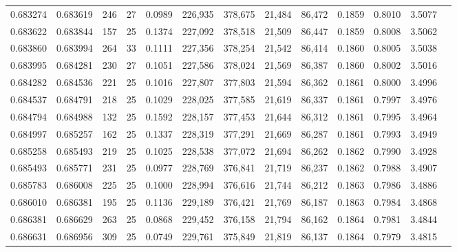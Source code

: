 \begin{tabular}{rrrrrrrrrrrrr}
0.683274 & 0.683619 &   246 &  27 &                                     0.0989 & 226,935 & 378,675 &  21,484 &  86,472 & 0.1859 & 0.8010 & 3.5077 \\
0.683622 & 0.683844 &   157 &  25 &                                     0.1374 & 227,092 & 378,518 &  21,509 &  86,447 & 0.1859 & 0.8008 & 3.5062 \\
0.683860 & 0.683994 &   264 &  33 &                                     0.1111 & 227,356 & 378,254 &  21,542 &  86,414 & 0.1860 & 0.8005 & 3.5038 \\
0.683995 & 0.684281 &   230 &  27 &                                     0.1051 & 227,586 & 378,024 &  21,569 &  86,387 & 0.1860 & 0.8002 & 3.5016 \\
0.684282 & 0.684536 &   221 &  25 &                                     0.1016 & 227,807 & 377,803 &  21,594 &  86,362 & 0.1861 & 0.8000 & 3.4996 \\
0.684537 & 0.684791 &   218 &  25 &                                     0.1029 & 228,025 & 377,585 &  21,619 &  86,337 & 0.1861 & 0.7997 & 3.4976 \\
0.684794 & 0.684988 &   132 &  25 &                                     0.1592 & 228,157 & 377,453 &  21,644 &  86,312 & 0.1861 & 0.7995 & 3.4964 \\
0.684997 & 0.685257 &   162 &  25 &                                     0.1337 & 228,319 & 377,291 &  21,669 &  86,287 & 0.1861 & 0.7993 & 3.4949 \\
0.685258 & 0.685493 &   219 &  25 &                                     0.1025 & 228,538 & 377,072 &  21,694 &  86,262 & 0.1862 & 0.7990 & 3.4928 \\
0.685493 & 0.685771 &   231 &  25 &                                     0.0977 & 228,769 & 376,841 &  21,719 &  86,237 & 0.1862 & 0.7988 & 3.4907 \\
0.685783 & 0.686008 &   225 &  25 &                                     0.1000 & 228,994 & 376,616 &  21,744 &  86,212 & 0.1863 & 0.7986 & 3.4886 \\
0.686010 & 0.686381 &   195 &  25 &                                     0.1136 & 229,189 & 376,421 &  21,769 &  86,187 & 0.1863 & 0.7984 & 3.4868 \\
0.686381 & 0.686629 &   263 &  25 &                                     0.0868 & 229,452 & 376,158 &  21,794 &  86,162 & 0.1864 & 0.7981 & 3.4844 \\
0.686631 & 0.686956 &   309 &  25 &                                     0.0749 & 229,761 & 375,849 &  21,819 &  86,137 & 0.1864 & 0.7979 & 3.4815 \\

\end{tabular}
